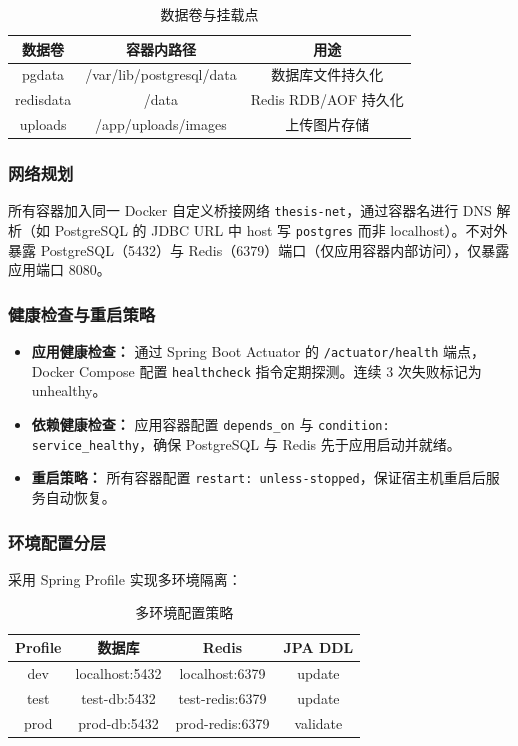 \documentclass{../softeng}
\begin{document}
\begin{table}[htbp]
\centering
\caption{数据卷与挂载点}
\label{tab:volumes}
\begin{tabular}{|c|c|c|}
\hline
\textbf{数据卷} & \textbf{容器内路径} & \textbf{用途} \\
\hline
pgdata & /var/lib/postgresql/data & 数据库文件持久化 \\
\hline
redisdata & /data & Redis RDB/AOF 持久化 \\
\hline
uploads & /app/uploads/images & 上传图片存储 \\
\hline
\end{tabular}
\end{table}

\subsubsection{网络规划}

所有容器加入同一 Docker 自定义桥接网络 \texttt{thesis-net}，通过容器名进行 DNS 解析（如 PostgreSQL 的 JDBC URL 中 host 写 \texttt{postgres} 而非 localhost）。不对外暴露 PostgreSQL（5432）与 Redis（6379）端口（仅应用容器内部访问），仅暴露应用端口 8080。

\subsubsection{健康检查与重启策略}

\begin{itemize}
    \item \textbf{应用健康检查：} 通过 Spring Boot Actuator 的 \texttt{/actuator/health} 端点，Docker Compose 配置 \texttt{healthcheck} 指令定期探测。连续 3 次失败标记为 unhealthy。
    \item \textbf{依赖健康检查：} 应用容器配置 \texttt{depends\_on} 与 \texttt{condition: service\_healthy}，确保 PostgreSQL 与 Redis 先于应用启动并就绪。
    \item \textbf{重启策略：} 所有容器配置 \texttt{restart: unless-stopped}，保证宿主机重启后服务自动恢复。
\end{itemize}

\subsubsection{环境配置分层}

采用 Spring Profile 实现多环境隔离：

\begin{table}[htbp]
\centering
\caption{多环境配置策略}
\label{tab:env-config}
\begin{tabular}{|c|c|c|c|}
\hline
\textbf{Profile} & \textbf{数据库} & \textbf{Redis} & \textbf{JPA DDL} \\
\hline
dev & localhost:5432 & localhost:6379 & update \\
\hline
test & test-db:5432 & test-redis:6379 & update \\
\hline
prod & prod-db:5432 & prod-redis:6379 & validate \\
\hline
\end{tabular}
\end{table}
\end{document}
